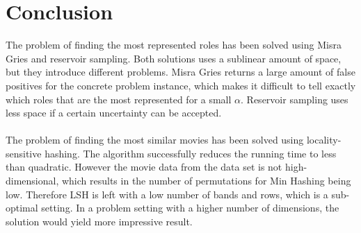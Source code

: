\section{Conclusion}
The problem of finding the most represented roles has been solved using Misra Gries and reservoir sampling. Both solutions uses a sublinear amount of space, but they introduce different problems. Misra Gries returns a large amount of false positives for the concrete problem instance, which makes it difficult to tell exactly which roles that are the most represented for a small \(\alpha\). Reservoir sampling uses less space if a certain uncertainty can be accepted.\\ \\
The problem of finding the most similar movies has been solved using locality-sensitive hashing. The algorithm successfully reduces the running time to less than quadratic. However the movie data from the data set is not high-dimensional, which results in the number of permutations for Min Hashing being low. Therefore LSH is left with a low number of bands and rows, which is a sub-optimal setting. In a problem setting with a higher number of dimensions, the solution would yield more impressive result.
